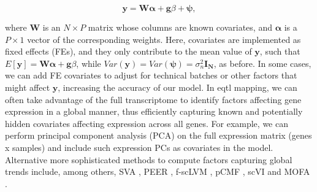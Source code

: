 \begin{equation}\label{eq:Linear_regression_genetics_covariates}
 \mathbf{y} =  \mathbf{W}\boldsymbol{\alpha} + \mathbf{g}\beta + \boldsymbol{\psi}, 
\end{equation}

where $\mathbf{W}$ is an $N \times P$ matrix whose columns are known covariates, and $\boldsymbol{\alpha}$ is a $P \times 1$ vector of the corresponding weights.
Here, covariates are implemented as fixed effects (FEs), and they only contribute to the mean value of $\mathbf{y}$, such that $E[\mathbf{y}] = \mathbf{W}\boldsymbol{\alpha} + \mathbf{g}\beta$, while $Var(\mathbf{y}) = Var(\boldsymbol{\psi}) = \sigma_n^2 \mathbf{I_N} $, as before.
In some cases, we can add FE covariates to adjust for
technical batches
or other factors that might 
affect $\mathbf{y}$, 
increasing the accuracy of our model.
In \gls{eqtl} mapping, we can often take advantage of the 
full transcriptome
to identify 
factors
affecting
gene expression in a global manner, 
thus efficiently capturing known and potentially hidden covariates affecting expression across all genes.
For example, we can perform principal component analysis (PCA) on the full expression matrix (genes x samples) and include such expression PCs as covariates in the model.
Alternative more sophisticated methods to compute factors capturing global trends include, among others,
SVA \cite{leek2007capturing}, 
PEER \cite{stegle2010bayesian, stegle2012using},
f-scLVM \cite{buettner2017f},
pCMF \cite{durif2019probabilistic},
scVI \cite{lopez2018deep, svensson2020interpretable}
and 
MOFA \cite{argelaguet2018multi}. 


